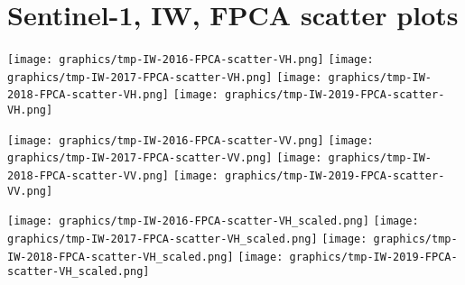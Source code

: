 
\section{Sentinel-1, IW, FPCA scatter plots}
\setcounter{theorem}{0}

\renewcommand{\theenumi}{\roman{enumi}}
\renewcommand{\labelenumi}{\textnormal{(\theenumi)}$\;\;$}


\begin{center}
\begin{minipage}{7.0in}
\texttt{[image: graphics/tmp-IW-2016-FPCA-scatter-VH.png]}
\quad
\texttt{[image: graphics/tmp-IW-2017-FPCA-scatter-VH.png]}
\vskip 1.0cm
\texttt{[image: graphics/tmp-IW-2018-FPCA-scatter-VH.png]}
\quad
\texttt{[image: graphics/tmp-IW-2019-FPCA-scatter-VH.png]}
\end{minipage}
\end{center}


\clearpage
\begin{center}
\begin{minipage}{7.0in}
\texttt{[image: graphics/tmp-IW-2016-FPCA-scatter-VV.png]}
\quad
\texttt{[image: graphics/tmp-IW-2017-FPCA-scatter-VV.png]}
\vskip 1.0cm
\texttt{[image: graphics/tmp-IW-2018-FPCA-scatter-VV.png]}
\quad
\texttt{[image: graphics/tmp-IW-2019-FPCA-scatter-VV.png]}
\end{minipage}
\end{center}


\clearpage
\begin{center}
\begin{minipage}{7.0in}
\texttt{[image: graphics/tmp-IW-2016-FPCA-scatter-VH\_scaled.png]}
\quad
\texttt{[image: graphics/tmp-IW-2017-FPCA-scatter-VH\_scaled.png]}
\vskip 1.0cm
\texttt{[image: graphics/tmp-IW-2018-FPCA-scatter-VH\_scaled.png]}
\quad
\texttt{[image: graphics/tmp-IW-2019-FPCA-scatter-VH\_scaled.png]}
\end{minipage}
\end{center}


